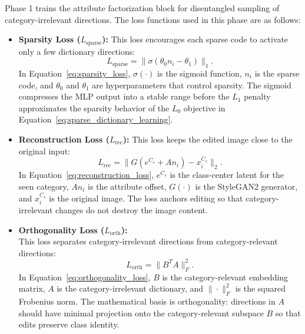 Phase 1 trains the attribute factorization block for disentangled sampling of category-irrelevant directions. The loss functions used in this phase are as follows:

\begin{itemize}
    \item \textbf{Sparsity Loss ($L_{\mathrm{sparse}}$):} This loss encourages each sparse code to activate only a few dictionary directions:
    \begin{equation}
        L_{\mathrm{sparse}} = \|\sigma(\theta_0 n_i - \theta_1)\|_1.
        \label{eq:sparsity_loss}
    \end{equation}
    In Equation~\eqref{eq:sparsity_loss}, $\sigma(\cdot)$ is the sigmoid function, $n_i$ is the sparse code, and $\theta_0$ and $\theta_1$ are hyperparameters that control sparsity. The sigmoid compresses the MLP output into a stable range before the $L_1$ penalty approximates the sparsity behavior of the $L_0$ objective in Equation~\eqref{eq:sparse_dictionary_learning}.

    \item \textbf{Reconstruction Loss ($L_{\mathrm{rec}}$):} This loss keeps the edited image close to the original input:
    \begin{equation}
        L_{\mathrm{rec}} = \|G(e^{C_s} + A n_i) - x_i^{C_s}\|_2.
        \label{eq:reconstruction_loss}
    \end{equation}
    In Equation~\eqref{eq:reconstruction_loss}, $e^{C_s}$ is the class-center latent for the seen category, $A n_i$ is the attribute offset, $G(\cdot)$ is the StyleGAN2 generator, and $x_i^{C_s}$ is the original image. The loss anchors editing so that category-irrelevant changes do not destroy the image content.

    \item \textbf{Orthogonality Loss ($L_{\mathrm{orth}}$):}\\
    This loss separates category-irrelevant directions from category-relevant directions:
    \begin{equation}
        L_{\mathrm{orth}} = \|B^T A\|_F^2.
        \label{eq:orthogonality_loss}
    \end{equation}
    In Equation~\eqref{eq:orthogonality_loss}, $B$ is the category-relevant embedding matrix, $A$ is the category-irrelevant dictionary, and $\|\cdot\|_F^2$ is the squared Frobenius norm. The mathematical basis is orthogonality: directions in $A$ should have minimal projection onto the category-relevant subspace $B$ so that edits preserve class identity.
\end{itemize}

